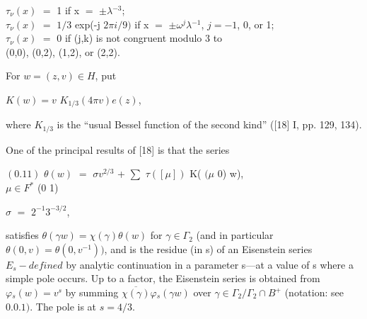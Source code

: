 \documentclass[10pt,a4paper]{article}
\begin{document}
\par\smallskip\begin{center}\begin{minipage}{0.96\textwidth}\centering
$\tau{}_\nu{}(x)$ $=$ 1 if x $=$ $\pm{}\lambda{}^{-3}$; \\ $\tau{}_\nu{}(x)$ $=$ $1/3$ exp(-j $2\pi{}i/9)$ if x $=$ $\pm{}\omega{}^j\lambda{}^{-1}$, $j=-1$, 0, or 1; \\ $\tau{}_\nu{}(x)$ $=$ 0 if (j,k) is not congruent modulo 3 to \\ (0,0), (0,2), (1,2), or (2,2).
\end{minipage}\end{center}\smallskip
\par For $w=(z,v)\in{}H$, put\par
\par\smallskip\begin{center}\begin{minipage}{0.96\textwidth}\centering
$K(w)=v$ $K_{1/3}(4\pi{}v)e(z)$,
\end{minipage}\end{center}\smallskip
\par where $K_{1/3}$ is the ``usual Bessel function of the second kind'' ([18] I, pp. 129, 134).\par
\par One of the principal results of [18] is that the series\par
\par\smallskip\begin{center}\begin{minipage}{0.96\textwidth}\centering
$(0.11)$ $\theta{}(w)$ $=$ $\sigma{}v^{2/3}$ + $\sum{}$ $\tau{}([\mu{}])$ K( $(\mu{}$ 0) w), \\ $\mu{}\in{}F^*$ (0 1)
\end{minipage}\end{center}\smallskip
\par\smallskip\begin{center}\begin{minipage}{0.96\textwidth}\centering
$\sigma{}$ $=$ $2^{-1}3^{-3/2}$,
\end{minipage}\end{center}\smallskip
\par satisfies $\theta{}(\gamma{}w)=\chi{}(\gamma{})\theta{}(w)$ for $\gamma{}\in{}\Gamma{}_2$ (and in particular $\theta{}(0,v)=\theta{}(0,v^{-1}))$, and is the residue (in s) of an Eisenstein series $E_s-defined$ by analytic continuation in a parameter s---at a value of s where a simple pole occurs. Up to a factor, the Eisenstein series is obtained from $\varphi{}_s(w)=v^s$ by summing $\overline{\chi{}(\gamma{})}\varphi{}_s(\gamma{}w)$ over $\gamma{}\in{}\Gamma{}_2/\Gamma{}_2\cap{}B^+$ (notation: see $0.0.1)$. The pole is at $s=4/3$.\par
\end{document}
